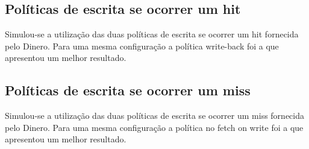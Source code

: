 \documentclass[12pt,a4paper]{article}
\begin{document}
\subsection{Políticas de escrita se ocorrer um hit}
Simulou-se a utilização das duas políticas de escrita se ocorrer um
hit fornecida pelo Dinero.
Para uma mesma configuração a política write-back foi a que apresentou um
melhor resultado.

\subsection{Políticas de escrita se ocorrer um miss}
Simulou-se a utilização das duas políticas de escrita se ocorrer um
miss fornecida pelo Dinero.
Para uma mesma configuração a política no fetch on write foi a que apresentou um
melhor resultado.
\end{document}
